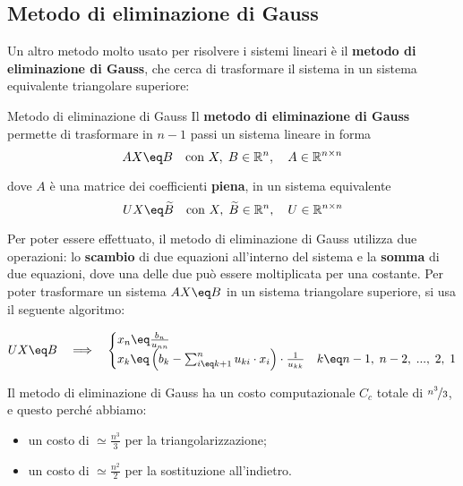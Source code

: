 \subsection{Metodo di eliminazione di Gauss}

Un altro metodo molto usato per risolvere i sistemi lineari è il \textbf{metodo di eliminazione di Gauss}, che cerca di trasformare il sistema in un sistema equivalente triangolare superiore:

\begin{definition}{Metodo di eliminazione di Gauss}
    Il \textbf{metodo di eliminazione di Gauss} permette di trasformare in $n - 1$ passi un sistema lineare in forma
    \[ A X \eq B \quad \text{con } X, \; B \in \mathbb{R}^n, \quad A \in \mathbb{R}^{n \times n} \]

    dove $A$ è una matrice dei coefficienti \textbf{piena}, in un sistema equivalente
    \[ U X \eq \widetilde{B} \quad \text{con } X, \; \widetilde{B} \in \mathbb{R}^n, \quad U \in \mathbb{R}^{n \times n} \]
\end{definition}

Per poter essere effettuato, il metodo di eliminazione di Gauss utilizza due operazioni: lo \textbf{scambio} di due equazioni all'interno del sistema e la \textbf{somma} di due equazioni, dove una delle due può essere moltiplicata per una costante.
\nwl
Per poter trasformare un sistema $AX \eq B$ in un sistema triangolare superiore, si usa il seguente algoritmo:

\[ UX \eq B \quad \Longrightarrow \quad \begin{cases}
    x_n \eq \frac{b_n}{u_{nn}} & \\
    x_k \eq \left( b_k - \sum_{i \eq k + 1}^n u_{ki} \cdot x_i \right) \cdot \frac{1}{u_{kk}} & k \eq n - 1, \; n - 2, \; ..., \; 2, \; 1
\end{cases} \]


Il metodo di eliminazione di Gauss ha un costo computazionale $C_c$ totale di $\nicefrac{n^3}{3}$, e questo perché abbiamo:
\begin{itemize}
    \item un costo di $\simeq \frac{n^3}{3}$ per la triangolarizzazione;
    \item un costo di $\simeq \frac{n^2}{2}$ per la sostituzione all'indietro.
\end{itemize}